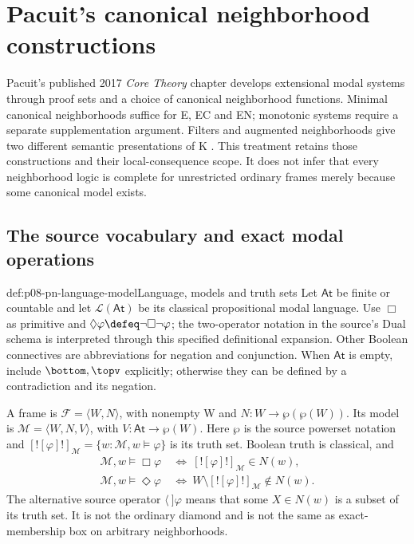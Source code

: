 \section{Pacuit's canonical neighborhood constructions}
\label{sec:p08-n-b-006-04}
\label{sec:p08-pacuit-neighborhood-source}

Pacuit's published 2017 \emph{Core Theory} chapter develops extensional
modal systems through proof sets and a choice of canonical neighborhood
functions. Minimal canonical neighborhoods suffice for E, EC and EN;
monotonic systems require a separate supplementation argument. Filters
and augmented neighborhoods give two different semantic presentations
of K \cite[\S\S2.2.1, 2.3, 2.5, pp.~47--49, 52--66, 80--82]{Pacuit2017}.
This treatment retains those constructions and their local-consequence
scope. It does not infer that every neighborhood logic is complete for
unrestricted ordinary frames merely because some canonical model exists.

\subsection{The source vocabulary and exact modal operations}

\begin{hbdefinition}{def:p08-pn-language-model}{Language, models and truth sets}
Let \(\mathsf{At}\) be finite or countable and let
\(\mathcal L(\mathsf{At})\) be its classical propositional modal
language. Use \(\Box\) as primitive and
\(\Diamond\varphi\defeq\neg\Box\neg\varphi\); the two-operator
notation in the source's Dual schema is interpreted through this
specified definitional expansion. Other Boolean connectives are
abbreviations for negation and conjunction. When \(\mathsf{At}\)
is empty, include \(\bottom,\topv\) explicitly; otherwise they
can be defined by a contradiction and its negation.

A frame is \(\mathcal F=\langle W,N\rangle\), with nonempty W
and \(N:W\to\wp(\wp(W))\). Its model is
\(\mathcal M=\langle W,N,V\rangle\), with
\(V:\mathsf{At}\to\wp(W)\). Here \(\wp\) is the source
powerset notation and
\([![\varphi]!]_{\mathcal M}=\{w:\mathcal M,w\models\varphi\}\)
is its truth set. Boolean truth is classical, and
\[
\begin{aligned}
 \mathcal M,w\models\Box\varphi
   &\ \Longleftrightarrow\ [![\varphi]!]_{\mathcal M}\in N(w),\\
 \mathcal M,w\models\Diamond\varphi
   &\ \Longleftrightarrow\ W\setminus[![\varphi]!]_{\mathcal M}
                         \notin N(w).
\end{aligned}
\]
The alternative source operator \(\langle\ ]\varphi\) means
that some \(X\in N(w)\) is a subset of its truth set. It is not
the ordinary diamond and is not the same as exact-membership box
on arbitrary neighborhoods.
\end{hbdefinition}

